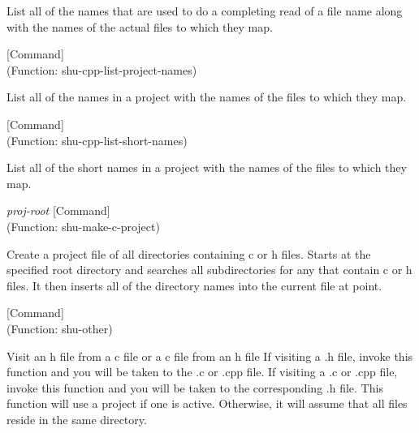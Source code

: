 \begin{doc-string}
List all of the names that are used to do a completing read of a file name
along with the names of the actual files to which they map.
\end{doc-string}

\vspace{1em}
\noindent
{}
\usebox{\funcname}
 \hfill [Command]\\%
 (Function: shu-cpp-list-project-names)

\begin{doc-string}
List all of the names in a project with the names of the files to
which they map.
\end{doc-string}

\vspace{1em}
\noindent
{}
\usebox{\funcname}
 \hfill [Command]\\%
 (Function: shu-cpp-list-short-names)

\begin{doc-string}
List all of the short names in a project with the names of the files to
which they map.
\end{doc-string}

\vspace{1em}
\noindent
{}
\usebox{\funcname}\emph{proj-root}
 \hfill [Command]\\%
 (Function: shu-make-c-project)

\begin{doc-string}
Create a project file of all directories containing c or h files.
Starts at the specified root directory and searches all subdirectories for
any that contain c or h files.  It then inserts all of the directory names
into the current file at point.
\end{doc-string}

\vspace{1em}
\noindent
{}
\usebox{\funcname}
 \hfill [Command]\\%
 (Function: shu-other)

\begin{doc-string}
Visit an h file from a c file or a c file from an h file If visiting a .h
file, invoke this function and you will be taken to the .c or .cpp file.  If
visiting a .c or .cpp file, invoke this function and you will be taken to the
corresponding .h file.  This function will use a project if one is active.
Otherwise, it will assume that all files reside in the same directory.
\end{doc-string}

